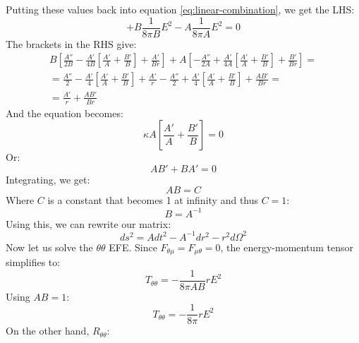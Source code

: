 \documentclass{article}
\begin{document}
Putting these values back into equation \ref{eq:linear-combination}, we get the LHS:
\begin{equation}
    +B\frac{1}{8\pi B}E^2 - A \frac{1}{8\pi A}E^2 = 0
\end{equation}
The brackets in the RHS give:
\begin{equation}
\begin{gathered}
    B\left[
        \frac{A''}{2B} - \frac{A'}{4B}\left[\frac{A'}{A} + \frac{B'}{B}\right] + \frac{A'}{Br}
    \right] + A\left[
        -\frac{A''}{2A} + \frac{A'}{4A}\left[\frac{A'}{A} + \frac{B'}{B}\right] + \frac{B'}{Br}
    \right] = \\ = 
        \frac{A''}{2} - \frac{A'}{4}\left[\frac{A'}{A} + \frac{B'}{B}\right] + \frac{A'}{r}- \frac{A''}{2} + \frac{A'}{4}\left[\frac{A'}{A} + \frac{B'}{B}\right] + \frac{AB'}{Br} = \\ =
        \frac{A'}{r} + \frac{AB'}{Br}
\end{gathered}
\end{equation}
And the equation becomes:
\begin{equation}
    \kappa A\left[\frac{A'}{A} + \frac{B'}{B}\right] = 0
\end{equation}
Or:
\begin{equation}
    AB' + BA' = 0
\end{equation}
Integrating, we get:
\begin{equation}
    AB = C
\end{equation}
Where $C$ is a constant that becomes 1 at infinity and thus $C = 1$:
\begin{equation}
    B = A^{-1}
\end{equation}
Using this, we can rewrite our matrix:
\begin{equation}
    ds^2 = A dt^2 - A^{-1}dr^2 - r^2d\Omega^2
\end{equation}
Now let us solve the $\theta\theta$ EFE. Since $F_{\theta\mu} = F_{\mu\theta} = 0$, the energy-momentum tensor simplifies to:
\begin{equation}
    T_{\theta\theta} = -\frac{1}{8\pi AB}rE^2
\end{equation}
Using $AB = 1$:
\begin{equation}
    T_{\theta\theta} = -\frac{1}{8\pi}rE^2
\end{equation}
On the other hand, $R_{\theta\theta}$:
\end{document}
